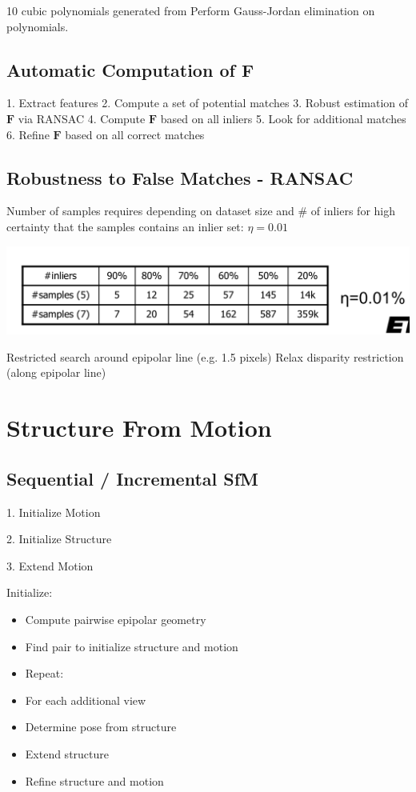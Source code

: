 10 cubic polynomials generated from 
Perform Gauss-Jordan elimination on polynomials.

\subsection{Automatic Computation of $\mathbf{F}$}
1. Extract features
2. Compute a set of potential matches
3. Robust estimation of $\mathbf{F}$ via RANSAC  
4. Compute $\mathbf{F}$ based on all inliers
5. Look for additional matches
6. Refine $\mathbf{F}$ based on all correct matches

\subsection{Robustness to False Matches - RANSAC}

Number of samples requires depending on dataset size and \# of inliers for high certainty that the samples contains an inlier set:
$\eta = 0.01$

\includegraphics[width=0.9\columnwidth]{cv_figures/ransac.png}

Restricted search around epipolar line (e.g. 1.5 pixels)
Relax disparity restriction (along epipolar line)


\section{Structure From Motion}
\subsection{Sequential / Incremental SfM}

1. Initialize Motion

2. Initialize Structure

3. Extend Motion

 Initialize:
\begin{itemize}
\item Compute pairwise epipolar geometry
\item Find pair to initialize structure and motion
\item Repeat:
\item For each additional view
\item Determine pose from structure 
\item Extend structure
\item Refine structure and motion
\end{itemize}

